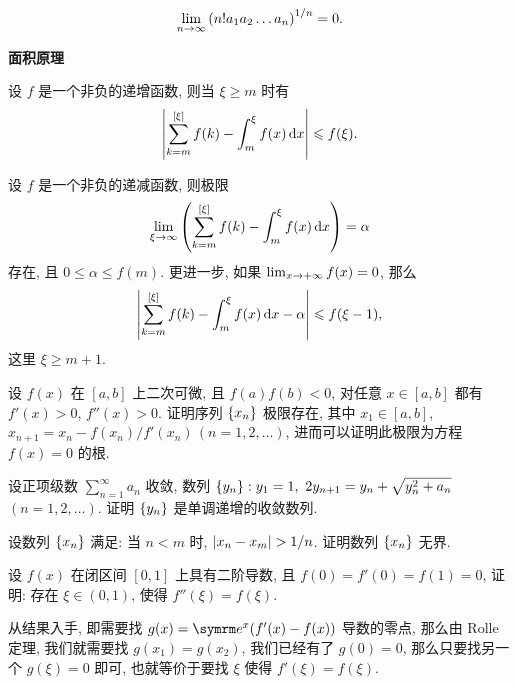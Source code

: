 \documentclass{ctexart}
\begin{document}
\begin{exercise}[series=exer]
    \begin{align*}
        \lim_{n \to \infty}\qty(n! a_{1} a_{2} \dots a_{n})^{1/n} = 0.
    \end{align*}
    \item \textbf{面积原理}
    \begin{exercise}
        \item 设 $ f $ 是一个非负的递增函数, 则当 $ \xi \ge m $ 时有
        \begin{align*}
            \abs{\sum_{k = m}^{[\xi]} f(k) - \int_{m}^{\xi} f(x) \dd{x}} \leqslant f(\xi).
        \end{align*}
        \item 设 $ f $ 是一个非负的递减函数, 则极限
        \begin{align*}
            \lim_{\xi \to \infty} \qty(\sum_{k = m}^{[\xi]} f(k) - \int_{m}^{\xi} f(x) \dd{x}) = \alpha
        \end{align*}
        存在, 且 $ 0 \le \alpha \le f(m) $. 更进一步, 如果 $ \lim_{x \to +\infty} f(x) = 0 $, 那么
        \begin{align*}
            \abs{\sum_{k = m}^{[\xi]} f(k) - \int_{m}^{\xi} f(x) \dd{x} - \alpha} \leqslant f(\xi - 1),
        \end{align*} 
        这里 $ \xi \ge m + 1 $. 
    \end{exercise}
    \item 设 $ f(x) $ 在 $ [a, b] $ 上二次可微, 且 $ f(a)f(b) < 0 $, 对任意 $ x \in [a, b] $ 都有 $ f'(x) > 0 $, $ f''(x) > 0 $. 证明序列 $ \qty{x_{n}} $ 极限存在, 其中 $ x_{1} \in [a, b] $, $ x_{n + 1} = x_{n} - f(x_{n})/f'(x_{n})\,(n = 1, 2, \dots) $, 进而可以证明此极限为方程 $ f(x) = 0 $ 的根. 
    \item 设正项级数 $ \sum_{n = 1}^{\infty} a_{n} $ 收敛, 数列 $ \qty{y_{n}} : y_{1} = 1,\ 2y_{n + 1} = y_{n} + \sqrt{y_{n}^{2} + a_{n}} $\, $ (n = 1, 2, \dots) $. 证明 $ \qty{y_{n}} $ 是单调递增的收敛数列. 
    \item 设数列 $ \qty{x_{n}} $ 满足: 当 $ n < m $ 时, $ \abs{x_{n} - x_{m}} > 1/n $. 证明数列 $ \qty{x_{n}} $ 无界.
    \item 设 $ f(x) $ 在闭区间 $ [0, 1] $ 上具有二阶导数, 且 $ f(0) = f'(0) = f(1) = 0 $, 证明: 存在 $ \xi \in (0, 1) $, 使得 $ f''(\xi) = f(\xi) $.
    \begin{hint}
        从结果入手, 即需要找 $ g(x) = \me^{x}(f'(x) - f(x)) $ 导数的零点, 那么由 Rolle 定理, 我们就需要找 $ g(x_{1}) = g(x_{2}) $, 我们已经有了 $ g(0) = 0 $, 那么只要找另一个 $ g(\xi) = 0 $ 即可, 也就等价于要找 $ \xi $ 使得 $ f'(\xi) = f(\xi) $.

\end{hint}
\end{exercise}
\end{document}
